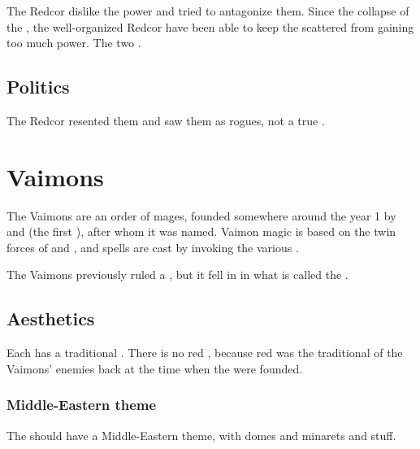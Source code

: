 The Redcor dislike the \pps{\Telcras} power and tried to antagonize them. 
Since the collapse of the \Telcra, the well-organized Redcor have been able to keep the scattered \Telcras{} from gaining too much power. 
The two \vclans {}. 









\subsection{Politics}
The Redcor resented them and saw them as rogues, not a true \vclan. 















\section{Vaimons}
The Vaimons are an order of \human{} mages, founded somewhere around the year 1 \IC{} by  and  (the first \VaimonCaliph), after whom it was named. Vaimon magic is based on the twin forces of \iquin{} and \nieur, and spells are cast by invoking the various \Archons{}. 

The Vaimons previously ruled a , but it fell in  in what is called the \quo{\Darkfall}. 










\subsection{Aesthetics}
Each \VaimonClan has a traditional \colour. There is no red \vclan, because red was the traditional \colour of the Vaimons' enemies back at the time when the \vclans were founded. 





\subsubsection{Middle-Eastern theme}
The \VaimonCaliphate should have a Middle-Eastern theme, with domes and minarets and stuff. 









